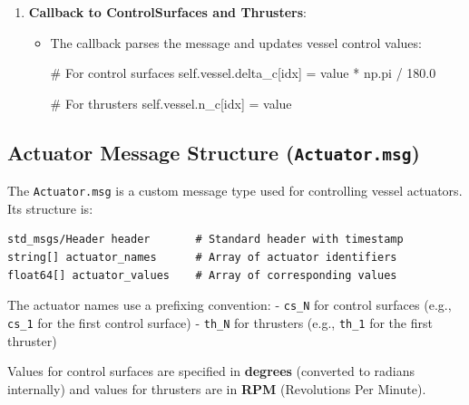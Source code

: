 \documentclass[
  letterpaper,
  DIV=11,
  numbers=noendperiod]{scrreprt}
\newenvironment{Shaded}{\begin{snugshade}}{\end{snugshade}}
\newcommand{\CommentTok}[1]{\textcolor[rgb]{0.37,0.37,0.37}{#1}}
\newcommand{\FloatTok}[1]{\textcolor[rgb]{0.68,0.00,0.00}{#1}}
\newcommand{\NormalTok}[1]{\textcolor[rgb]{0.00,0.23,0.31}{#1}}
\newcommand{\OperatorTok}[1]{\textcolor[rgb]{0.37,0.37,0.37}{#1}}
\newcommand{\VariableTok}[1]{\textcolor[rgb]{0.07,0.07,0.07}{#1}}
\providecommand{\tightlist}{%
  \setlength{\itemsep}{0pt}\setlength{\parskip}{0pt}}\usepackage{longtable,booktabs,array}
\begin{document}
\begin{enumerate}
  \begin{itemize}
  \tightlist
  \item
    The subscriber triggers \texttt{actuator\_callback(msg)} in
    \texttt{Vessel\_Pub\_Sub}
  \end{itemize}
\item
  \textbf{Callback to ControlSurfaces and Thrusters}:

  \begin{itemize}
  \item
    The callback parses the message and updates vessel control values:

\begin{Shaded}
\begin{Highlighting}[]
\CommentTok{\# For control surfaces}
\VariableTok{self}\NormalTok{.vessel.delta\_c[idx] }\OperatorTok{=}\NormalTok{ value }\OperatorTok{*}\NormalTok{ np.pi }\OperatorTok{/} \FloatTok{180.0}

\CommentTok{\# For thrusters}
\VariableTok{self}\NormalTok{.vessel.n\_c[idx] }\OperatorTok{=}\NormalTok{ value}
\end{Highlighting}
\end{Shaded}
  \end{itemize}
\end{enumerate}

\subsection*{\texorpdfstring{Actuator Message Structure
(\texttt{Actuator.msg})}{Actuator Message Structure (Actuator.msg)}}\label{actuator-message-structure-actuator.msg}

The \texttt{Actuator.msg} is a custom message type used for controlling
vessel actuators. Its structure is:

\begin{verbatim}
std_msgs/Header header       # Standard header with timestamp
string[] actuator_names      # Array of actuator identifiers
float64[] actuator_values    # Array of corresponding values
\end{verbatim}

The actuator names use a prefixing convention: - \texttt{cs\_N} for
control surfaces (e.g., \texttt{cs\_1} for the first control surface) -
\texttt{th\_N} for thrusters (e.g., \texttt{th\_1} for the first
thruster)

Values for control surfaces are specified in \textbf{degrees} (converted
to radians internally) and values for thrusters are in \textbf{RPM}
(Revolutions Per Minute).
\end{document}
